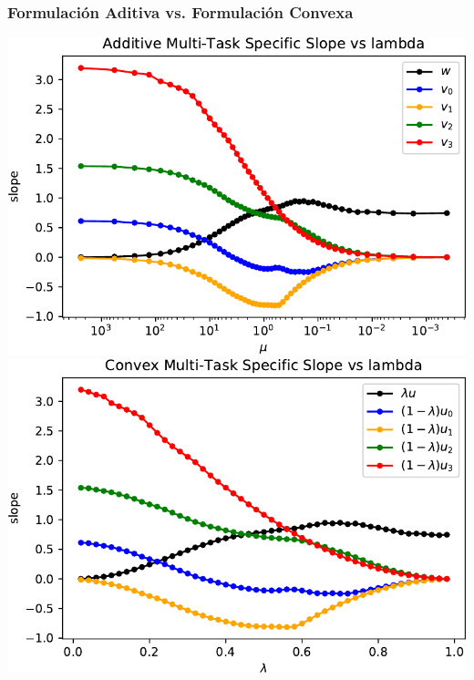 \documentclass[aspectratio=43,spanish]{beamer}
\begin{document}
\begin{frame}
      \frametitle{Formulación Aditiva vs. Formulación Convexa}

    

    \includegraphics[width=.5\textwidth]{Chapter6/HAIS2019/synthetic_specWeights_add-crop.pdf}%
    \includegraphics[width=.5\textwidth]{Chapter6/HAIS2019/synthetic_specWeights_conv-crop.pdf}%

    

\end{frame}
\end{document}
